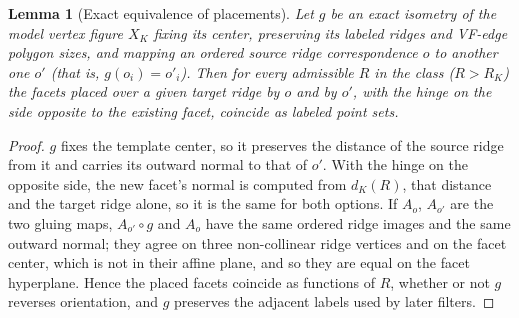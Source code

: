 \documentclass[11pt]{article}
\newtheorem{lemma}[theorem]{Lemma}
\theoremstyle{definition}
\theoremstyle{remark}
\begin{document}
\begin{appendices}
\label{sec:S2}\label{sec:U2}
\begin{lemma}[Exact equivalence of placements]\label{lem:equiv}
Let $g$ be an exact isometry of the model vertex figure $X_K$ fixing its
center, preserving its labeled ridges and VF-edge polygon sizes, and
mapping an ordered source ridge correspondence $o$ to another one $o'$
(that is, $g(o_i)=o'_i$). Then for every admissible $R$ in the class
($R>R_K$) the facets placed over a given target ridge by $o$ and by $o'$,
with the hinge on the side opposite to the existing facet, coincide as
labeled point sets.
\end{lemma}
\begin{proof}
$g$ fixes the template center, so it preserves the distance of the source
ridge from it and carries its outward normal to that of $o'$. With the
hinge on the opposite side, the new facet's normal is computed from
$d_K(R)$, that distance and the target ridge alone, so it is the same for
both options. If $A_o$, $A_{o'}$ are the two gluing maps, $A_{o'}\circ g$
and $A_o$ have the same ordered ridge images and the same outward normal;
they agree on three non-collinear ridge vertices and on the facet center,
which is not in their affine plane, and so they are equal on the facet
hyperplane. Hence the placed facets coincide as functions of $R$, whether
or not $g$ reverses orientation, and $g$ preserves the adjacent labels
used by later filters.
\end{proof}


\end{appendices}
\end{document}
